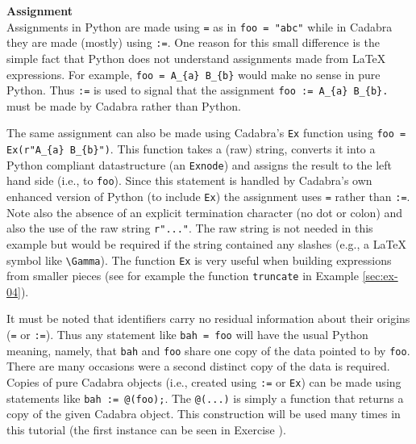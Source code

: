 \documentclass[a4paper,12pt]{article}
\numberwithin{equation}{section}%
\begin{document}
{\bf Assignment}\\[5pt]
Assignments in Python are made using \verb|=| as in \verb|foo = "abc"| while in Cadabra they
are made (mostly) using \verb|:=|. One reason for this small difference is the simple fact
that Python does not understand assignments made from LaTeX expressions. For example,
\verb|foo = A_{a} B_{b}| would make no sense in pure Python. Thus \verb|:=| is used to
signal that the assignment \verb|foo := A_{a} B_{b}.| must be made by Cadabra rather than
Python.

The same assignment can also be made using Cadabra's \verb|Ex| function using
\verb|foo = Ex(r"A_{a} B_{b}")|. This function takes a (raw) string, converts it into a
Python compliant datastructure (an \verb|Exnode|) and assigns the result to the left hand
side (i.e., to \verb|foo|). Since this statement is handled by Cadabra's own enhanced
version of Python (to include \verb|Ex|) the assignment uses \verb|=| rather than \verb|:=|.
Note also the absence of an explicit termination character (no dot or colon) and also the use
of the raw string \verb|r"..."|. The raw string is not needed in this example but would be
required if the string contained any slashes (e.g., a LaTeX symbol like \verb|\Gamma|). The
function \verb|Ex| is very useful when building expressions from smaller pieces (see for
example the function \verb|truncate| in Example \ref{sec:ex-04}).

It must be noted that identifiers carry no residual information about their origins
(\verb|=| or \verb|:=|). Thus any statement like \verb|bah = foo| will have the usual Python
meaning, namely, that \verb|bah| and \verb|foo| share one copy of the data pointed to by
\verb|foo|. There are many occasions were a second distinct copy of the data is required.
Copies of pure Cadabra objects (i.e., created using \verb|:=| or \verb|Ex|) can be made
using statements like \verb|bah := @(foo);|. The \verb|@(...)| is simply a function that
returns a copy of the given Cadabra object. This construction will be used many times in
this tutorial (the first instance can be seen in Exercise ).
\end{document}
